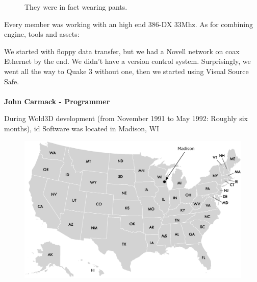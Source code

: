 \documentclass[book.tex]{subfiles}
\begin{document}
\begin{figure}[H]
\centering
\caption{They were in fact wearing pants.}
\label{fig:id_team_1993}
\end{figure}

Every member was working with an high end 386-DX 33Mhz. As for combining engine, tools and assets:\\

 \begin{fancyquotes}
We started with floppy data transfer, but we had a Novell network on coax Ethernet by the end. We didn't have a version control system.  Surprisingly, we went all the way to Quake 3 without one, then we started using Visual Source Safe.\\
 \\
\textbf{John Carmack - Programmer}
\end{fancyquotes}







During Wold3D development (from November 1991 to May 1992: Roughly six months), id Software was located in Madison, WI
\begin{figure}[H]
\centering
 \includegraphics[width=\textwidth]{map/usa-id-software.eps}
 \end{figure}
\end{document}

